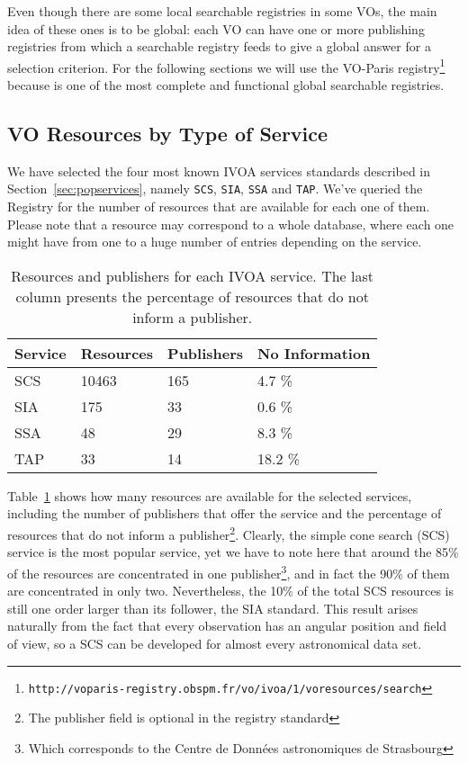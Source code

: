 Even though there are some local searchable registries in some VOs, the
main idea of these ones is to be global: each VO can have one or more
publishing registries from which a searchable registry feeds to give
a global answer for a selection criterion. For the following sections
we will use the VO-Paris
registry\footnote{\texttt{http://voparis-registry.obspm.fr/vo/ivoa/1/voresources/search}}
because is one of the most complete and functional global searchable registries.

\subsection{VO Resources by Type of Service}

We have selected the four most known IVOA services standards described in Section~\ref{sec:popservices}, namely
\verb+SCS+, \verb+SIA+, \verb+SSA+ and \verb+TAP+. We've queried the Registry for the number of resources 
that are available for each one of them. Please note that a resource may correspond to a whole database, where
each one might have from one to a huge number of entries depending on the service. 

\begin{table}
\begin{center}
\begin{tabular}{|l|l|l|l|}
\hline
\textbf{Service} & \textbf{Resources} & \textbf{Publishers} & \textbf{No
Information} \\
\hline
SCS  &  10463 & 165 & 4.7 \% \\
SIA  &  175 & 33 & 0.6 \% \\
SSA  &  48  & 29 & 8.3 \% \\
TAP  &  33  & 14 & 18.2 \% \\
\hline
\end{tabular}
\caption{Resources and publishers for each IVOA service. The last column
presents the percentage of resources that do not inform a publisher.}
\label{tab:serviceRanking}
\end{center}
\end{table}

Table~\ref{tab:serviceRanking} shows how many resources are available for the
selected services, including the number of publishers that offer the service
and the percentage of resources that do not inform a publisher\footnote{The
publisher field is optional in the registry standard}. Clearly, the simple
cone search (SCS) service is the most popular service, yet we have to note
here that around the 85\% of the resources are concentrated in one publisher\footnote{Which corresponds to the Centre de Données astronomiques de Strasbourg},
and in fact the 90\% of them are concentrated in only two. Nevertheless, the 
10\% of the total SCS resources is still one order larger than its follower, 
the SIA standard. This result arises naturally from the fact that every
observation has an angular position and field of view, so a SCS can be 
developed for almost every astronomical data set.

